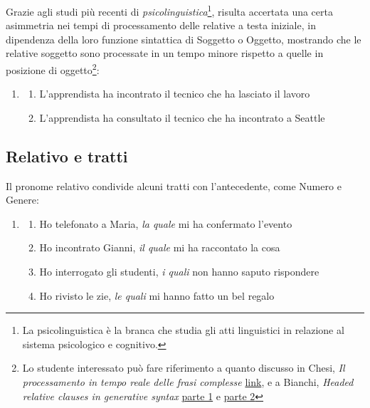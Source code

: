 \documentclass[
  a4paper,
  twoside,
  11pt,
  chapterprefix=false,
  bibliography=totocnumbered,
  listof=flat]{scrbook}
\providecommand{\tightlist}{%
  \setlength{\itemsep}{0pt}\setlength{\parskip}{0pt}}
\begin{document}
Grazie agli studi più recenti di \emph{psicolinguistica}\footnote{La psicolinguistica è la branca che studia gli atti linguistici in relazione al sistema psicologico e cognitivo.}, risulta accertata una certa asimmetria nei tempi di processamento delle relative a testa iniziale, in dipendenza della loro funzione sintattica di Soggetto o Oggetto, mostrando che le relative soggetto sono processate in un tempo minore rispetto a quelle in posizione di oggetto\footnote{Lo studente interessato può fare riferimento a quanto discusso in Chesi, \emph{Il processamento in tempo reale delle frasi complesse} \href{https://www.researchgate.net/publication/303471198_Il_processamento_in_tempo_reale_delle_frasi_complesse}{link}, e a Bianchi, \emph{Headed relative clauses in generative syntax} \href{https://people.umass.edu/bhatt/752-s05/bianchi-glot6.7.pdf}{parte 1} e \href{https://people.umass.edu/bhatt/752-s05/bianchi-glot6.8.pdf}{parte 2} }:

\begin{enumerate}
\def\labelenumi{(\arabic{enumi})}
\setcounter{enumi}{126}
\item
  \begin{enumerate}
  \def\labelenumii{\alph{enumii}.}
  \tightlist
  \item
    L'apprendista ha incontrato il tecnico che ha lasciato il lavoro
  \item
    L'apprendista ha consultato il tecnico che ha incontrato a Seattle
  \end{enumerate}
\end{enumerate}

\hypertarget{relativo-e-tratti}{%
\subsection{Relativo e tratti}\label{relativo-e-tratti}}

Il pronome relativo condivide alcuni tratti con l'antecedente, come Numero e Genere:

\begin{enumerate}
\def\labelenumi{(\arabic{enumi})}
\setcounter{enumi}{127}
\item
  \begin{enumerate}
  \def\labelenumii{\alph{enumii}.}
  \tightlist
  \item
    Ho telefonato a Maria, \emph{la quale} mi ha confermato l'evento
  \item
    Ho incontrato Gianni, \emph{il quale} mi ha raccontato la cosa
  \item
    Ho interrogato gli studenti, \emph{i quali} non hanno saputo rispondere
  \item
    Ho rivisto le zie, \emph{le quali} mi hanno fatto un bel regalo
  \end{enumerate}
\end{enumerate}
\end{document}
